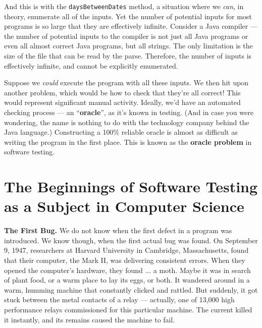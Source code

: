 And this is with the {\tt daysBetweenDates} method, a situation where we {\it
can}, in theory, enumerate all of the inputs. Yet the number of potential inputs
for most programs is so large that they are effectively infinite. Consider a
Java compiler --- the number of potential inputs to the compiler is not just all
Java programs or even all almost correct Java programs, but all strings. The
only limitation is the size of the file that can be read by the parse.
Therefore, the number of inputs is effectively infinite, and cannot be
explicitly enumerated.


Suppose we {\it could} execute the program with all these inputs. We then hit
upon another problem, which would be how to check that they're all correct! This
would represent significant manual activity. Ideally, we'd have an automated
checking process --- an ``{\bf oracle}'', as it's known in testing. (And in case
you were wondering, the name is nothing to do with the technology company behind
the Java language.) Constructing a 100\% reliable oracle is almost as difficult
as writing the program in the first place. This is known as the {\bf oracle
problem} in software testing.



\section{The Beginnings of Software Testing as a Subject in Computer
\mbox{Science}}

{\bf The First Bug.}
%
We do not know when the first defect in a program was introduced. We know
though, when the first actual bug was found. 
%
On September 9, 1947, researchers at Harvard University in Cambridge,
Massachusetts, found that their computer, the Mark II, was delivering consistent
errors. When they opened the computer's hardware, they found ... a moth.
%
Maybe it was in search of plant food, or a warm place to lay its eggs, or both.
It wandered around in a warm, humming machine that constantly clicked and
rattled. But suddenly, it got stuck between the metal contacts of a relay ---
actually, one of 13,000 high performance relays commissioned for this particular
machine. The current killed it instantly, and its remains caused the machine to
fail.

